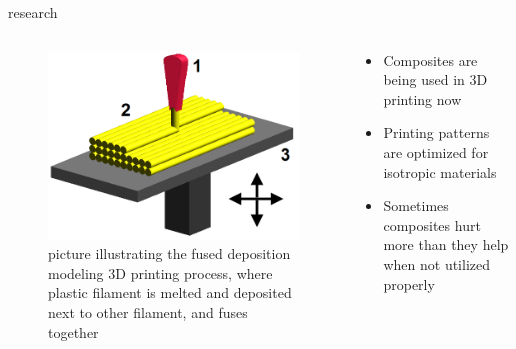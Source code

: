 \documentclass[
  letterpaper,
  ignorenonframetext,
  aspectratio=43,
  handout,
  12pt]{beamer}
\providecommand{\tightlist}{%
  \setlength{\itemsep}{0pt}\setlength{\parskip}{0pt}}
\providecommand{\tightlist}{%
\setlength{\itemsep}{0pt}\setlength{\parskip}{0pt}}
\let\Oldincludegraphics\includegraphics
\renewcommand{\includegraphics}[2][]{\Oldincludegraphics[width=\textwidth,height=0.7\textheight,keepaspectratio]{#2}}
\begin{document}
\begin{frame}{research}
\protect\hypertarget{research-2}{}
\begin{columns}[T]
\begin{column}{0.5\textwidth}
\begin{figure}
\centering
\includegraphics{../images/3D-printing.png}
\caption{picture illustrating the fused deposition modeling 3D printing
process, where plastic filament is melted and deposited next to other
filament, and fuses together}
\end{figure}
\end{column}

\begin{column}{0.5\textwidth}
\begin{itemize}
\tightlist
\item
  Composites are being used in 3D printing now
\item
  Printing patterns are optimized for isotropic materials
\item
  Sometimes composites hurt more than they help when not utilized
  properly
\end{itemize}
\end{column}
\end{columns}
\end{frame}
\end{document}
